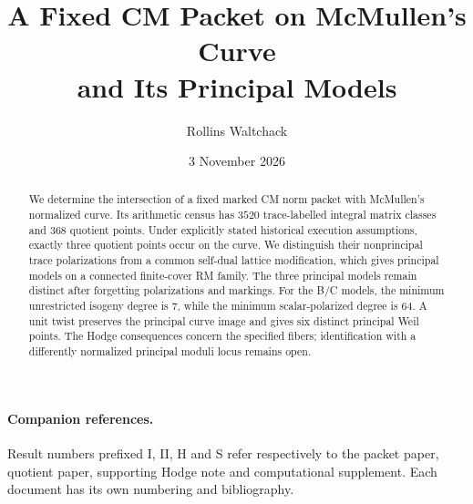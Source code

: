 \documentclass[11pt]{article}
\title{A Fixed CM Packet on McMullen's Curve\\and Its Principal Models}
\author{Rollins Waltchack}
\date{3 November 2026}
\begin{document}
\maketitle
\begin{abstract}
We determine the intersection of a fixed marked CM norm packet with
McMullen's normalized curve. Its arithmetic census has $3520$
trace-labelled integral matrix classes and $368$ quotient points.
Under explicitly stated historical execution assumptions, exactly three
quotient points occur on the curve. We distinguish their nonprincipal
trace polarizations from a common self-dual lattice modification, which
gives principal models on a connected finite-cover RM family. The three
principal models remain distinct after forgetting polarizations and
markings. For the B/C models, the minimum unrestricted isogeny degree is
$7$, while the minimum scalar-polarized degree is $64$. A unit twist
preserves the principal curve image and gives six distinct principal Weil
points. The Hodge consequences concern the specified fibers; identification
with a differently normalized principal moduli locus remains open.
\end{abstract}
\paragraph{Companion references.}
Result numbers prefixed I, II, H and S refer respectively to the packet
paper, quotient paper, supporting Hodge note and computational supplement.
Each document has its own numbering and bibliography.
{\small\tableofcontents}
\clearpage









\begingroup\small

\endgroup
\end{document}
